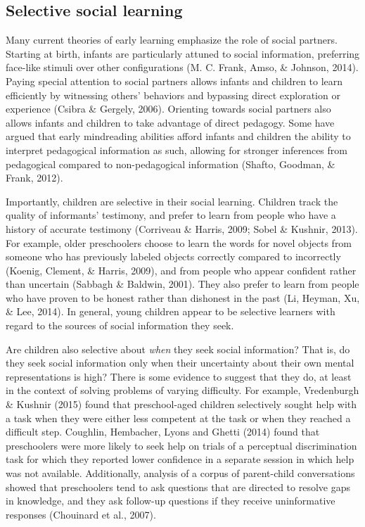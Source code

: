 \documentclass[a4paper,man,apacite,floatsintext]{apa6}
\begin{document}
\subsection{Selective social learning}\label{selective-social-learning}

Many current theories of early learning emphasize the role of social
partners. Starting at birth, infants are particularly attuned to social
information, preferring face-like stimuli over other configurations (M.
C. Frank, Amso, \& Johnson, 2014). Paying special attention to social
partners allows infants and children to learn efficiently by witnessing
others' behaviors and bypassing direct exploration or experience (Csibra
\& Gergely, 2006). Orienting towards social partners also allows infants
and children to take advantage of direct pedagogy. Some have argued that
early mindreading abilities afford infants and children the ability to
interpret pedagogical information as such, allowing for stronger
inferences from pedagogical compared to non-pedagogical information
(Shafto, Goodman, \& Frank, 2012).

Importantly, children are selective in their social learning. Children
track the quality of informants' testimony, and prefer to learn from
people who have a history of accurate testimony (Corriveau \& Harris,
2009; Sobel \& Kushnir, 2013). For example, older preschoolers choose to
learn the words for novel objects from someone who has previously
labeled objects correctly compared to incorrectly (Koenig, Clement, \&
Harris, 2009), and from people who appear confident rather than
uncertain (Sabbagh \& Baldwin, 2001). They also prefer to learn from
people who have proven to be honest rather than dishonest in the past
(Li, Heyman, Xu, \& Lee, 2014). In general, young children appear to be
selective learners with regard to the sources of social information they
seek.

Are children also selective about \emph{when} they seek social
information? That is, do they seek social information only when their
uncertainty about their own mental representations is high? There is
some evidence to suggest that they do, at least in the context of
solving problems of varying difficulty. For example, Vredenburgh \&
Kushnir (2015) found that preschool-aged children selectively sought
help with a task when they were either less competent at the task or
when they reached a difficult step. Coughlin, Hembacher, Lyons and
Ghetti (2014) found that preschoolers were more likely to seek help on
trials of a perceptual discrimination task for which they reported lower
confidence in a separate session in which help was not available.
Additionally, analysis of a corpus of parent-child conversations showed
that preschoolers tend to ask questions that are directed to resolve
gaps in knowledge, and they ask follow-up questions if they receive
uninformative responses (Chouinard et al., 2007).
\end{document}
